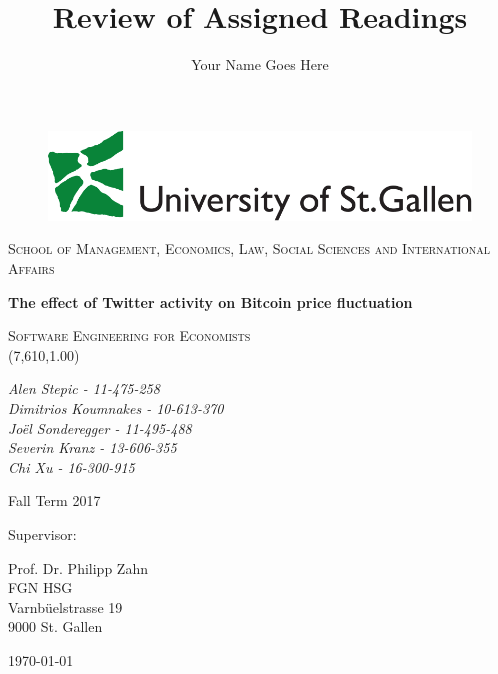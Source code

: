 \documentclass[a4paper,american,12pt]{article}
\title{Review of Assigned Readings}
\author{Your Name Goes Here}
\begin{document}
\begin{titlepage}
	\begin{figure}
	\centering
	\includegraphics[scale=0.32]{logohsg}
	\end{figure}
\centering
{\scshape\large School of Management, Economics, Law, Social Sciences and International Affairs \par}
\vspace{2.0cm}
{\huge\bfseries The effect of Twitter activity on Bitcoin price fluctuation  \par}
\vspace{2.0cm}
{\scshape\Large Software Engineering for Economists \\(7,610,1.00) \par}
\vspace{2.0cm}
{\itshape\large Alen Stepic - 11-475-258 \\Dimitrios Koumnakes - 10-613-370 \\Joël Sonderegger - 11-495-488 \\Severin Kranz - 13-606-355 \\Chi Xu - 16-300-915 \par}
	\begin{spacing}{1}
	\vspace{1.2cm}
	{Fall Term 2017 \par}
	\vspace{1.2cm}
	Supervisor:\\
	{Prof. Dr. Philipp Zahn\\ FGN HSG\\ Varnbüelstrasse 19\\ 9000 St. Gallen \par}
	\end{spacing}
\vfill
{\large \today\par}
\end{titlepage}
    
\clearpage
    
\end{document}
